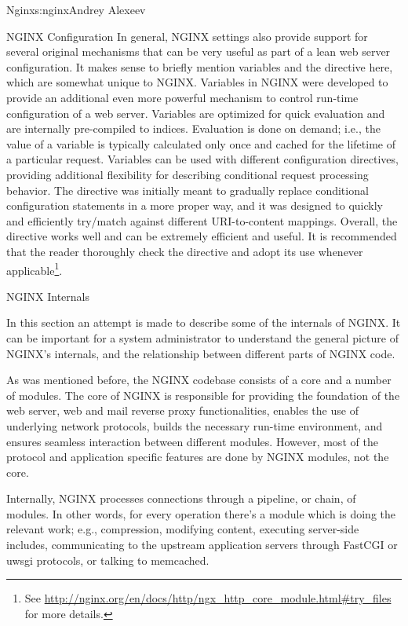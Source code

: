 \begin{aosachapter}{Nginx}{s:nginx}{Andrey Alexeev}
\begin{aosasect1}{NGINX Configuration}
In general, NGINX settings also provide support for several original
mechanisms that can be very useful as part of a lean web server
configuration. It makes sense to briefly mention variables and the
 directive here, which are somewhat unique to
NGINX. Variables in NGINX were developed to provide an additional even
more powerful mechanism to control run-time configuration of a web
server. Variables are optimized for quick evaluation and are
internally pre-compiled to indices. Evaluation is done on demand;
i.e., the value of a variable is typically calculated only once and
cached for the lifetime of a particular request. Variables can be used
with different configuration directives, providing additional
flexibility for describing conditional request processing
behavior. The  directive was initially meant to
gradually replace conditional  configuration statements in a
more proper way, and it was designed to quickly and efficiently
try/match against different URI-to-content mappings. Overall, the
 directive works well and can be extremely efficient
and useful. It is recommended that the reader thoroughly check the
 directive and adopt its use whenever
applicable\footnote{See
  \url{http://nginx.org/en/docs/http/ngx\_http\_core\_module.html#try\_files}
  for more details.}.

\end{aosasect1}

\begin{aosasect1}{NGINX Internals} \label{sec.nginx.internals}

In this section an attempt is made to describe some of the internals
of NGINX. It can be important for a system administrator to understand
the general picture of NGINX's internals, and the relationship between
different parts of NGINX code.

As was mentioned before, the NGINX codebase consists of a core and a
number of modules. The core of NGINX is responsible for providing the
foundation of the web server, web and mail reverse proxy
functionalities, enables the use of underlying network protocols,
builds the necessary run-time environment, and ensures seamless
interaction between different modules. However, most of the protocol
and application specific features are done by NGINX modules, not the
core.

Internally, NGINX processes connections through a pipeline, or chain,
of modules. In other words, for every operation there's a module which
is doing the relevant work; e.g., compression, modifying content,
executing server-side includes, communicating to the upstream
application servers through FastCGI or uwsgi protocols, or talking to
memcached.


\end{aosasect1}
\end{aosachapter}
